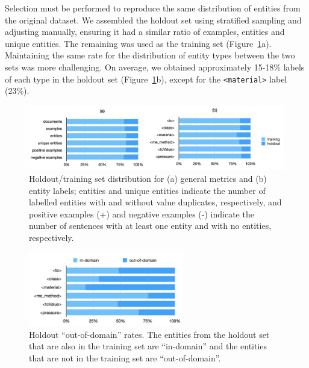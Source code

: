 Selection must be performed to reproduce the same distribution of entities from the original dataset.
We assembled the holdout set using stratified sampling and adjusting manually, ensuring it had a similar ratio of examples, entities and unique entities. The remaining was used as the training set (Figure~\ref{fig:training-holdout-set-distribution}a).
Maintaining the same rate for the distribution of entity types between the two sets was more challenging. On average, we obtained approximately 15-18\% labels of each type in the holdout set (Figure~\ref{fig:training-holdout-set-distribution}b), except for the \texttt{<material>} label (23\%). 

\begin{figure}[ht]
    \centering
    \includegraphics[width=\textwidth]{figures/automatic_extraction_supercon/superconductor-holdout-training-set}
    \caption{Holdout/training set distribution for (a) general metrics and (b) entity labels; entities and unique entities indicate the number of labelled entities with and without value duplicates, respectively, and positive examples (+) and negative examples (-) indicate the number of sentences with at least one entity and with no entities, respectively.}
    \label{fig:training-holdout-set-distribution}
\end{figure}

\begin{figure}[ht]
    \centering
    \includegraphics[width=0.6\textwidth]{figures/automatic_extraction_supercon/superconductor-out-domain-holdout-unique}
    \caption{Holdout ``out-of-domain'' rates. The entities from the holdout set that are also in the training set are ``in-domain'' and the entities that are not in the training set are ``out-of-domain''.}
    \label{fig:out-domain-holdout}
\end{figure}

